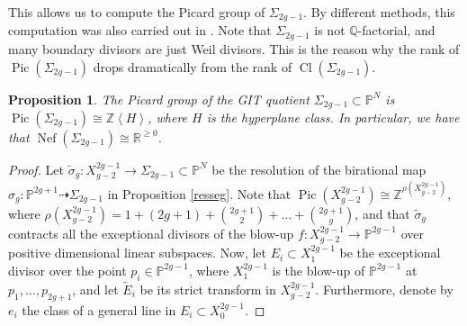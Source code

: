 \documentclass[a4paper,10pt]{amsart}
\newtheorem{Proposition}[thm]{Proposition}
\theoremstyle{definition}
\DeclareMathOperator{\Cl}{Cl}
\DeclareMathOperator{\Pic}{Pic}
\DeclareMathOperator{\Nef}{Nef}
\begin{document}
This allows us to compute the Picard group of $\Sigma_{2g-1}$. By different methods, this computation was also carried out in \cite{MS16}. Note that $\Sigma_{2g-1}$ is not $\mathbb{Q}$-factorial, and many boundary divisors are just Weil divisors. This is the reason why the rank of $\Pic(\Sigma_{2g-1})$ drops dramatically from the rank of $\Cl(\Sigma_{2g-1})$.

\begin{Proposition}\label{picpari}
The Picard group of the GIT quotient $\Sigma_{2g-1}\subset\mathbb{P}^N$ is $\Pic(\Sigma_{2g-1})\cong \mathbb{Z}\left\langle H\right\rangle$, where $H$ is the hyperplane class. In particular, we have that $\Nef(\Sigma_{2g-1})\cong\mathbb{R}^{\geq 0}$.
\end{Proposition}
\begin{proof}
Let $\widetilde{\sigma}_g: X^{2g-1}_{g-2}\rightarrow \Sigma_{2g-1}\subset\mathbb{P}^N$ be the resolution of the birational map $\sigma_g:\mathbb{P}^{2g+1}\dasharrow \Sigma_{2g-1}$ in Proposition \ref{resseg}. Note that $\Pic(X^{2g-1}_{g-2})\cong \mathbb{Z}^{\rho(X^{2g-1}_{g-2})}$, where $\rho(X^{2g-1}_{g-2}) = 1+(2g+1)+\binom{2g+1}{2}+\dots+\binom{2g+1}{g}$, and that $\widetilde{\sigma}_g$ contracts all the exceptional divisors of the blow-up $f:X^{2g-1}_{g-2}\rightarrow\mathbb{P}^{2g-1}$ over positive dimensional linear subspaces. Now, let $E_i\subset X_1^{2g-1}$ be the exceptional divisor over the point $p_i\in \mathbb{P}^{2g-1}$, where $X^{2g-1}_{1}$ is the blow-up of $\mathbb{P}^{2g-1}$ at $p_1,\dots,p_{2g+1}$, and let $\widetilde{E}_i$ be its strict transform in $X^{2g-1}_{g-2}$. Furthermore, denote by $e_i$ the class of a general line in $E_i\subset X_{0}^{2g-1}$. 


\end{proof}
\end{document}
